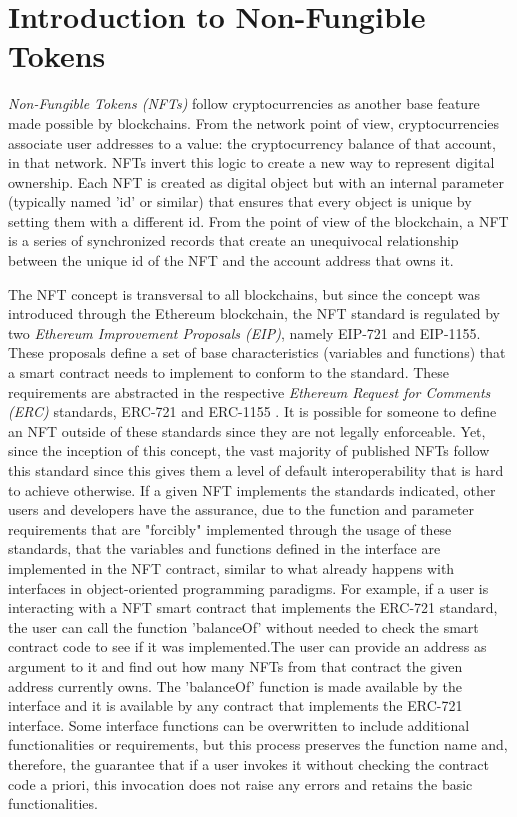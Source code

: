 \documentclass[../main.tex]{subfiles}
\begin{document}
\section{Introduction to Non-Fungible Tokens}
\label{sec:introduction_nfts}

\textit{Non-Fungible Tokens (NFTs)} follow cryptocurrencies as another base feature made possible by blockchains. From the network point of view, cryptocurrencies associate user addresses to a value: the cryptocurrency balance of that account, in that network. NFTs invert this logic to create a new way to represent digital ownership. Each NFT is created as digital object but with an internal parameter (typically named 'id' or similar) that ensures that every object is unique by setting them with a different id. From the point of view of the blockchain, a NFT is a series of synchronized records that create an unequivocal relationship between the unique id of the NFT and the account address that owns it.
\par
The NFT concept is transversal to all blockchains, but since the concept was introduced through the Ethereum blockchain, the NFT standard is regulated by two \textit{Ethereum Improvement Proposals (EIP)}, namely EIP-721 and EIP-1155. These proposals define a set of base characteristics (variables and functions) that a smart contract needs to implement to conform to the standard. These requirements are abstracted in the respective \textit{Ethereum Request for Comments (ERC)} standards, ERC-721 \cite{ERC721} and ERC-1155 \cite{ERC1155}. It is possible for someone to define an NFT outside of these standards since they are not legally enforceable. Yet, since the inception of this concept, the vast majority of published NFTs follow this standard since this gives them a level of default interoperability that is hard to achieve otherwise. If a given NFT implements the standards indicated, other users and developers have the assurance, due to the function and parameter requirements that are "forcibly" implemented through the usage of these standards, that the variables and functions defined in the interface are implemented in the NFT contract, similar to what already happens with interfaces in object-oriented programming paradigms. For example, if a user is interacting with a NFT smart contract that implements the ERC-721 standard, the user can call the function 'balanceOf' without needed to check the smart contract code to see if it was implemented.The user can provide an address as argument to it and find out how many NFTs from that contract the given address currently owns. The 'balanceOf' function is made available by the interface and it is available by any contract that implements the ERC-721 interface. Some interface functions can be overwritten to include additional functionalities or requirements, but this process preserves the function name and, therefore, the guarantee that if a user invokes it without checking the contract code a priori, this invocation does not raise any errors and retains the basic functionalities.
\end{document}
